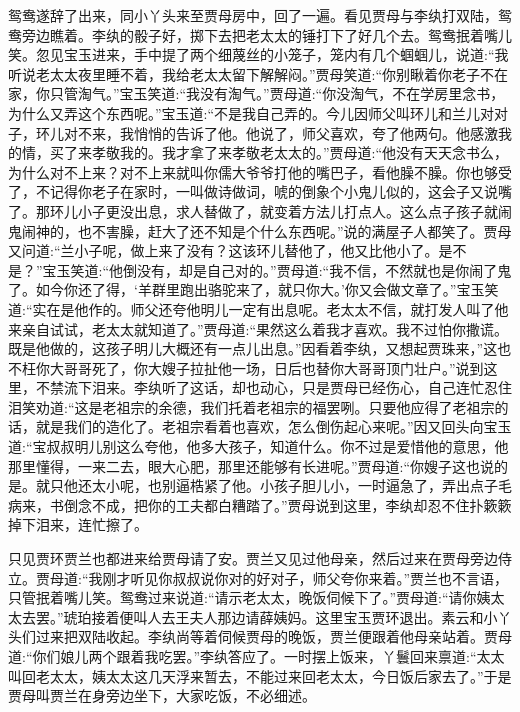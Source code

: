 \begin{parag}
    鸳鸯遂辞了出来，同小丫头来至贾母房中，回了一遍。看见贾母与李纨打双陆，鸳鸯旁边瞧着。李纨的骰子好，掷下去把老太太的锤打下了好几个去。鸳鸯抿着嘴儿笑。忽见宝玉进来，手中提了两个细蔑丝的小笼子，笼内有几个蝈蝈儿，说道:“我听说老太太夜里睡不着，我给老太太留下解解闷。”贾母笑道:“你别瞅着你老子不在家，你只管淘气。”宝玉笑道:“我没有淘气。”贾母道:“你没淘气，不在学房里念书，为什么又弄这个东西呢。”宝玉道:“不是我自己弄的。今儿因师父叫环儿和兰儿对对子，环儿对不来，我悄悄的告诉了他。他说了，师父喜欢，夸了他两句。他感激我的情，买了来孝敬我的。我才拿了来孝敬老太太的。”贾母道:“他没有天天念书么，为什么对不上来？对不上来就叫你儒大爷爷打他的嘴巴子，看他臊不臊。你也够受了，不记得你老子在家时，一叫做诗做词，唬的倒象个小鬼儿似的，这会子又说嘴了。那环儿小子更没出息，求人替做了，就变着方法儿打点人。这么点子孩子就闹鬼闹神的，也不害臊，赶大了还不知是个什么东西呢。”说的满屋子人都笑了。贾母又问道:“兰小子呢，做上来了没有？这该环儿替他了，他又比他小了。是不是？”宝玉笑道:“他倒没有，却是自己对的。”贾母道:“我不信，不然就也是你闹了鬼了。如今你还了得，‘羊群里跑出骆驼来了，就只你大。’你又会做文章了。”宝玉笑道:“实在是他作的。师父还夸他明儿一定有出息呢。老太太不信，就打发人叫了他来亲自试试，老太太就知道了。”贾母道:“果然这么着我才喜欢。我不过怕你撒谎。既是他做的，这孩子明儿大概还有一点儿出息。”因看着李纨，又想起贾珠来，”这也不枉你大哥哥死了，你大嫂子拉扯他一场，日后也替你大哥哥顶门壮户。”说到这里，不禁流下泪来。李纨听了这话，却也动心，只是贾母已经伤心，自己连忙忍住泪笑劝道:“这是老祖宗的余德，我们托着老祖宗的福罢咧。只要他应得了老祖宗的话，就是我们的造化了。老祖宗看着也喜欢，怎么倒伤起心来呢。”因又回头向宝玉道:“宝叔叔明儿别这么夸他，他多大孩子，知道什么。你不过是爱惜他的意思，他那里懂得，一来二去，眼大心肥，那里还能够有长进呢。”贾母道:“你嫂子这也说的是。就只他还太小呢，也别逼梏紧了他。小孩子胆儿小，一时逼急了，弄出点子毛病来，书倒念不成，把你的工夫都白糟踏了。”贾母说到这里，李纨却忍不住扑簌簌掉下泪来，连忙擦了。
\end{parag}


\begin{parag}
    只见贾环贾兰也都进来给贾母请了安。贾兰又见过他母亲，然后过来在贾母旁边侍立。贾母道:“我刚才听见你叔叔说你对的好对子，师父夸你来着。”贾兰也不言语，只管抿着嘴儿笑。鸳鸯过来说道:“请示老太太，晚饭伺候下了。”贾母道:“请你姨太太去罢。”琥珀接着便叫人去王夫人那边请薛姨妈。这里宝玉贾环退出。素云和小丫头们过来把双陆收起。李纨尚等着伺候贾母的晚饭，贾兰便跟着他母亲站着。贾母道:“你们娘儿两个跟着我吃罢。”李纨答应了。一时摆上饭来，丫鬟回来禀道:“太太叫回老太太，姨太太这几天浮来暂去，不能过来回老太太，今日饭后家去了。”于是贾母叫贾兰在身旁边坐下，大家吃饭，不必细述。
\end{parag}


